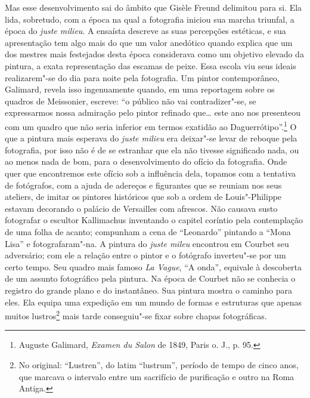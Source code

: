 Mas esse desenvolvimento sai do âmbito que Gisèle Freund delimitou
para si. Ela lida, sobretudo, com a época na qual a fotografia iniciou
sua marcha triunfal, a época do \emph{juste milieu}. A ensaísta
descreve as suas percepções estéticas, e sua
apresentação tem algo mais do que um valor anedótico quando explica que
um dos mestres mais festejados desta época considerava como um objetivo
elevado da pintura, a exata representação das escamas de peixe. Essa
escola viu seus ideais realizarem"-se do dia para noite pela fotografia.
Um pintor contemporâneo, Galimard, revela isso ingenuamente quando, em
uma reportagem sobre os quadros de Meissonier, escreve: ``o público não
vai contradizer"-se, se expressarmos nossa admiração pelo pintor
refinado que\ldots{} este ano nos presenteou com um quadro que não seria
inferior em termos exatidão ao Daguerrótipo''.\footnote{Auguste Galimard,
  \emph{Examen du Salon} de 1849, Paris o. J., p. 95.} O que a pintura
mais esperava do \emph{juste milieu} era deixar"-se levar de reboque pela
fotografia, por isso não é de se estranhar que ela não tivesse
significado nada, ou ao menos nada de bom, para o desenvolvimento do
ofício da fotografia. Onde quer que encontremos este ofício sob a
influência dela, topamos com a tentativa de fotógrafos, com a ajuda de
adereços e figurantes que se reuniam nos seus ateliers, de imitar os
pintores históricos que sob a ordem de Louis"-Philippe estavam decorando
o palácio de Versailles com afrescos. Não causava susto fotografar o
escultor Kallimachus inventando o capitel coríntio pela contemplação de
uma folha de acanto; compunham a cena de ``Leonardo'' pintando a ``Mona
Lisa'' e fotografaram"-na. A pintura do \emph{juste mileu} encontrou em
Courbet seu adversário; com ele a relação entre o pintor e o fotógrafo
inverteu"-se por um certo tempo. Seu quadro mais famoso \emph{La Vague},
``A onda'', equivale à descoberta de um assunto fotográfico pela
pintura. Na época de Courbet não se conhecia o registro do grande plano
e do instantâneo. Sua pintura mostra o caminho para eles. Ela equipa uma
expedição em um mundo de formas e estruturas que apenas muitos
lustros\footnote{No original: ``Lustren'', do latim ``lustrum'',
  período de tempo de cinco anos, que marcava o intervalo entre um
  sacrifício de purificação e outro na Roma Antiga. \versal{[N. T.]}} mais tarde
conseguiu"-se fixar sobre chapas fotográficas.

